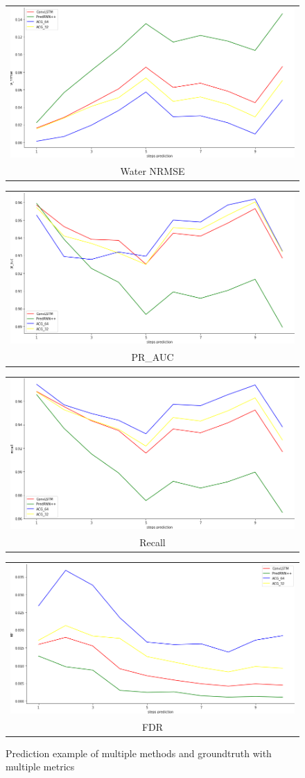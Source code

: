 \begin{figure}
\begin{center}
        \begin{tabular}[b]{c}
            \includegraphics[width=.4\linewidth]{figures/chap4/10/30/w_nrmse.png} \\
            \small Water NRMSE
          \end{tabular}
          \begin{tabular}[b]{c}
            \includegraphics[width=.4\linewidth]{figures/chap4/10/30/pr_auc.png} \\
            \small PR\_AUC
          \end{tabular}
          \begin{tabular}[b]{c}
              \includegraphics[width=.4\linewidth]{figures/chap4/10/30/recall.png} \\
              \small Recall
          \end{tabular} 
          \begin{tabular}[b]{c}
              \includegraphics[width=.4\linewidth]{figures/chap4/10/30/fdr.png} \\
              \small FDR
          \end{tabular}
    \end{center}
    \caption[]{Prediction example of multiple methods and groundtruth with multiple metrics}
    \label{fig:chap4-test-30}
\end{figure}


